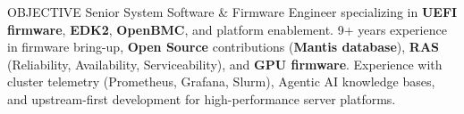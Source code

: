 \documentclass{resume} %
\begin{document}
\def\profile{0}


\begin{rSection}{OBJECTIVE}
{Senior System Software \& Firmware Engineer specializing in \textbf{UEFI firmware}, \textbf{EDK2}, \textbf{OpenBMC}, and platform enablement. 9+ years experience in firmware bring-up, \textbf{Open Source} contributions (\textbf{Mantis database}), \textbf{RAS} (Reliability, Availability, Serviceability), and \textbf{GPU firmware}. Experience with cluster telemetry (Prometheus, Grafana, Slurm), Agentic AI knowledge bases, and upstream-first development for high-performance server platforms.}

\end{rSection}




\end{document}

